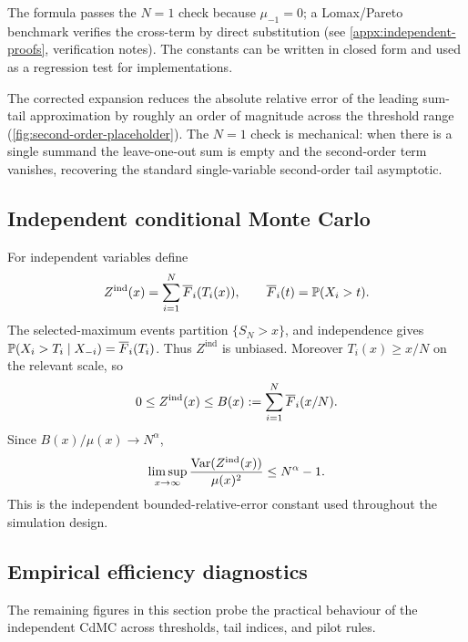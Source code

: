 The formula passes the \(N=1\) check because \(\mu_{-1}=0\); a Lomax/Pareto
benchmark verifies the cross-term by direct substitution (see
\cref{appx:independent-proofs}, verification notes). The constants can be
written in closed form and used as a regression test for implementations.



The corrected expansion reduces the absolute relative error of the
leading sum-tail approximation by roughly an order of magnitude across
the threshold range (\cref{fig:second-order-placeholder}). The
$N=1$ check is mechanical: when there is a single summand the
leave-one-out sum is empty and the second-order term vanishes,
recovering the standard single-variable second-order tail asymptotic.

\subsection{Independent conditional Monte Carlo}

For independent variables define
\[
  Z^{\mathrm{ind}}(x)=\sum_{i=1}^N \overline{F}_i(T_i(x)),
  \qquad \overline{F}_i(t)=\mathbb{P}(X_i>t).
\]
The selected-maximum events partition \(\{S_N>x\}\), and independence gives
\(\mathbb{P}(X_i>T_i\mid X_{-i})=\overline{F}_i(T_i)\). Thus \(Z^{\mathrm{ind}}\) is unbiased.
Moreover \(T_i(x)\ge x/N\) on the relevant scale, so
\[
  0\le Z^{\mathrm{ind}}(x)\le B(x):=\sum_{i=1}^N\overline{F}_i(x/N).
\]
Since \(B(x)/\mu(x)\to N^\alpha\),
\[
  \limsup_{x\to\infty}
  \frac{\operatorname{Var}(Z^{\mathrm{ind}}(x))}{\mu(x)^2}
  \le N^\alpha-1.
\]
This is the independent bounded-relative-error constant used throughout the
simulation design.

\begin{table}[t]
\centering

\caption[Independent estimator summary]{Independent estimator summary from the
baseline manuscript. The dependent sections extend the conditioning kernel,
shock basis, block basis, and radial basis while keeping this table as the
comparison point.}
\label{tab:ind-estimator-summary}
\end{table}

\subsection{Empirical efficiency diagnostics}
\label{sec:ind-empirical-diagnostics}

The remaining figures in this section probe the practical behaviour of
the independent CdMC across thresholds, tail indices, and pilot rules.

